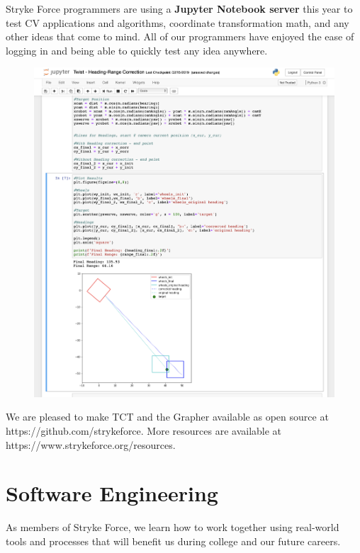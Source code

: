 \documentclass[10pt,tumble]{leaflet}
\begin{document}
Stryke Force programmers are using a \textbf{Jupyter Notebook server} this year to test CV applications and algorithms, coordinate transformation math, and any other ideas that come to mind. All of our programmers have enjoyed the ease of logging in and being able to quickly test any idea anywhere.

\begin{figure}[H]
	\centering
	\includegraphics[scale=0.25]{assets/jupyter}
\end{figure}

\begin{figure}[H]
 \centering
\end{figure}

We are pleased to make TCT and the Grapher available as open source at https://github.com/strykeforce. More resources are available at https://www.strykeforce.org/resources.

\section{Software Engineering}

As members of Stryke Force, we learn how to work together using real-world tools and processes that will benefit us during college and our future careers.
\end{document}
